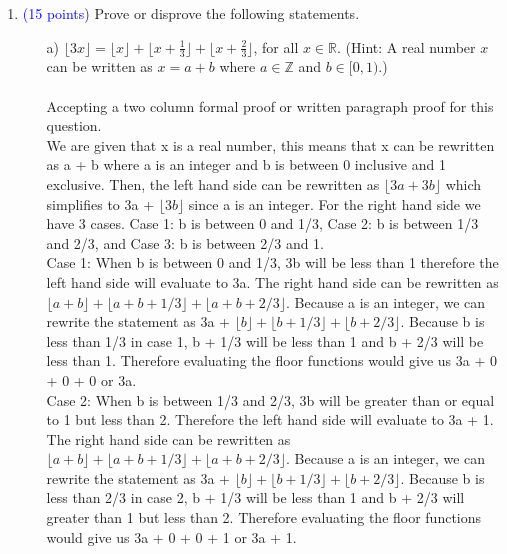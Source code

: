 \documentclass{article}
\newcommand{\pt}[1]{\textcolor{blue}{(#1 points)}}
\begin{document}
\begin{enumerate}
\item \pt{15} Prove or disprove the following statements.
\begin{enumerate}
    \item[a)] $\lfloor 3x \rfloor = \lfloor x \rfloor + \lfloor x + \frac{1}{3} \rfloor + \lfloor x + \frac{2}{3} \rfloor$, for all $x \in \mathbb{R}$. (Hint: A real number $x$ can be written as $x = a+ b$ where $a \in \mathbb{Z}$ and $b \in [0,1)$.)
    \\\\Accepting a two column formal proof or written paragraph proof for this question.\\
    We are given that x is a real number, this means that x can be rewritten as a + b where a is an integer and b is between 0 inclusive and 1 exclusive. Then, the left hand side can be rewritten as $\lfloor 3a + 3b \rfloor$ which simplifies to 3a + $\lfloor 3b \rfloor$ since a is an integer. For the right hand side we have 3 cases. Case 1: b is between 0 and 1/3, Case 2: b is between 1/3 and 2/3, and Case 3: b is between 2/3 and 1.\\
    Case 1: When b is between 0 and 1/3, 3b will be less than 1 therefore the left hand side will evaluate to 3a. The right hand side can be rewritten as $\lfloor a + b \rfloor + \lfloor a + b + 1/3\rfloor + \lfloor a + b + 2/3\rfloor$. Because a is an integer, we can rewrite the statement as 3a + $\lfloor b \rfloor + \lfloor b + 1/3\rfloor + \lfloor b + 2/3\rfloor$. Because b is less than 1/3 in case 1, b + 1/3 will be less than 1 and b + 2/3 will be less than 1. Therefore evaluating the floor functions would give us 3a + 0 + 0 + 0 or 3a.\\
    
    Case 2: When b is between 1/3 and 2/3, 3b will be greater than or equal to 1 but less than 2. Therefore the left hand side will evaluate to 3a + 1. The right hand side can be rewritten as $\lfloor a + b \rfloor + \lfloor a + b + 1/3\rfloor + \lfloor a + b + 2/3\rfloor$. Because a is an integer, we can rewrite the statement as 3a + $\lfloor b \rfloor + \lfloor b + 1/3\rfloor + \lfloor b + 2/3\rfloor$. Because b is less than 2/3 in case 2, b + 1/3 will be less than 1 and b + 2/3 will greater than 1 but less than 2. Therefore evaluating the floor functions would give us 3a + 0 + 0 + 1 or 3a + 1.\\
    

\end{enumerate}
\end{enumerate}
\end{document}
